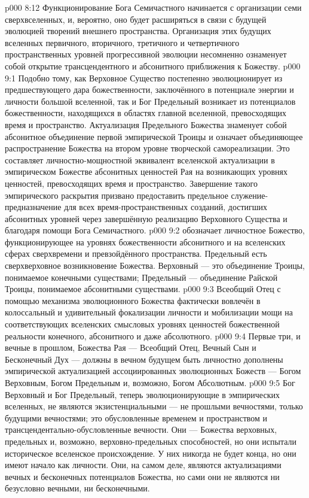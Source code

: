 \vs p000 8:12 Функционирование Бога Семичастного начинается с организации семи сверхвселенных, и, вероятно, оно будет расширяться в связи с будущей эволюцией творений внешнего пространства. Организация этих будущих вселенных первичного, вторичного, третичного и четвертичного пространственных уровней прогрессивной эволюции несомненно ознаменует собой открытие трансцендентного и абсонитного приближения к Божеству.
\vs p000 9:1 Подобно тому, как Верховное Существо постепенно эволюционирует из предшествующего дара божественности, заключённого в потенциале энергии и личности большой вселенной, так и Бог Предельный возникает из потенциалов божественности, находящихся в областях главной вселенной, превосходящих время и пространство. Актуализация Предельного Божества знаменует собой абсонитное объединение первой эмпирической Троицы и означает объединяющее распространение Божества на втором уровне творческой самореализации. Это составляет личностно\hyp{}мощностной эквивалент вселенской актуализации в эмпирическом Божестве абсонитных ценностей Рая на возникающих уровнях ценностей, превосходящих время и пространство. Завершение такого эмпирического раскрытия призвано предоставить предельное служение\hyp{}предназначение для всех время\hyp{}пространственных созданий, достигших абсонитных уровней через завершённую реализацию Верховного Существа и благодаря помощи Бога Семичастного.
\vs p000 9:2 \pc {} обозначает личностное Божество, функционирующее на уровнях божественности абсонитного и на вселенских сферах сверхвремени и превзойдённого пространства. Предельный есть сверхверховное возникновение Божества. Верховный --- это объединение Троицы, понимаемое конечными существами; Предельный --- объединение Райской Троицы, понимаемое абсонитными существами.
\vs p000 9:3 Всеобщий Отец с помощью механизма эволюционного Божества фактически вовлечён в колоссальный и удивительный  фокализации личности и мобилизации мощи на соответствующих вселенских смысловых уровнях ценностей божественной реальности конечного, абсонитного и даже абсолютного.
\vs p000 9:4 Первые три, и вечные в прошлом, Божества Рая --- Всеобщий Отец, Вечный Сын и Бесконечный Дух --- должны в вечном будущем быть личностно дополнены эмпирической актуализацией ассоциированных эволюционных Божеств --- Богом Верховным, Богом Предельным и, возможно, Богом Абсолютным.
\vs p000 9:5 \pc Бог Верховный и Бог Предельный, теперь эволюционирующие в эмпирических вселенных, не являются экзистенциальными --- не прошлыми вечностями, только будущими вечностями; это обусловленные временем и пространством и трансцендентально\hyp{}обусловленные вечности. Они --- Божества верховных, предельных и, возможно, верховно\hyp{}предельных способностей, но они испытали историческое вселенское происхождение. У них никогда не будет конца, но они имеют начало как личности. Они, на самом деле, являются актуализациями вечных и бесконечных потенциалов Божества, но сами они не являются ни безусловно вечными, ни бесконечными.
